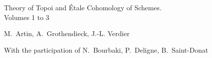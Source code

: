 \documentclass[12pt]{../fichiers-configuration-latex/amsbook}
\begin{document}
\frontmatter
\begin{center}
{\Large Theory of Topoi and Étale Cohomology of Schemes.\\
Volumes 1 to 3}\\
\end{center}

\vskip1cm
\begin{center}
M.~Artin, A.~Grothendieck, J.-L. Verdier
\end{center}

\vskip1cm
\begin{center}
With the participation of N.~Bourbaki, P.~Deligne, B.~Saint-Donat
\end{center}

\tableofcontents

\mainmatter

\def\danslelivre{1}

\def\thechapter{\Roman{chapter}}
\def\chaptername{Exposé}

\makeatletter
{}
\makeatother


\makeatletter
{}
\makeatother


\makeatletter
{}
\makeatother


\makeatletter
{}
\makeatother


\makeatletter
{}
\makeatother


\renewcommand*{\thechapter}{Vbis}
\makeatletter
{}
\makeatother

\setcounter{chapter}{5}
\def\thechapter{\Roman{chapter}}

\makeatletter
{}
\makeatother


\makeatletter
{}
\makeatother


\makeatletter
{}
\makeatother


\makeatletter
{}
\makeatother


\makeatletter
{}
\makeatother


\makeatletter
{}
\makeatother

\end{document}
